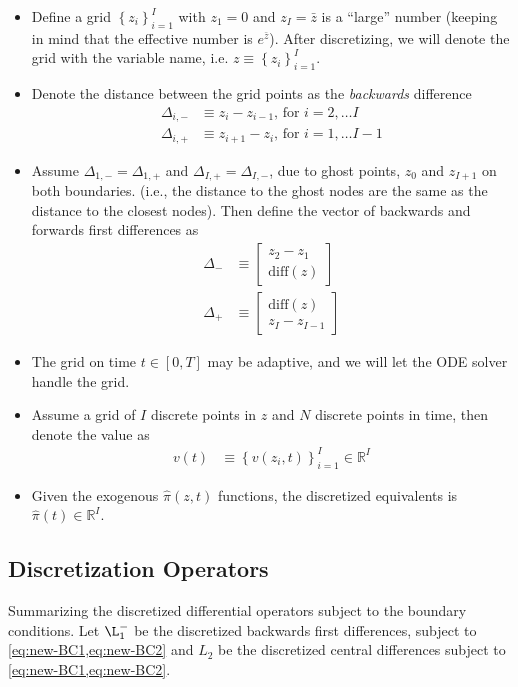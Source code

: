 \documentclass[11pt]{article}
\newcommand{\R}{\ensuremath{\mathbb{R}}}
\newcommand{\set}[1]{\ensuremath{\left\{{#1}\right\}}}
\begin{document}
\begin{itemize}
	\item Define a  grid $\set{z_i}_{i=1}^I$ with $z_1 = 0$ and $z_I = \bar{z}$ is a ``large'' number (keeping in mind that the effective number is $e^{\bar{z}}$).  After discretizing, we will denote the grid with the variable name, i.e. $z \equiv \set{z_i}_{i=1}^I$.
	\item Denote the distance between the grid points as the \textit{backwards} difference
	\begin{align}
			\Delta_{i,-} &\equiv z_i - z_{i-1},\, \text{for } i = 2,\ldots I\\
			\Delta_{i,+} &\equiv z_{i+1} - z_i,\, \text{for } i = 1,\ldots I-1
	\end{align}
	\item Assume $\Delta_{1, -} = \Delta_{1, +}$ and $\Delta_{I, +} = \Delta_{I, -}$, due to ghost points, $z_0$ and $z_{I+1}$ on both boundaries. (i.e., the distance to the ghost nodes are the same as the distance to the closest nodes).  Then define the vector of backwards and forwards first differences as
	\begin{align}
		\Delta_{-} &\equiv \begin{bmatrix} z_2 - z_1 \\
			\text{diff}(z)
		\end{bmatrix}\\
		\Delta_{+} &\equiv \begin{bmatrix} \text{diff}(z)\\
			z_I - z_{I-1}
		\end{bmatrix}
	\end{align}
	\item The grid on time $t \in [0,T]$ may be adaptive, and we will let the ODE solver handle the grid.	
	\item Assume a grid of $I$ discrete points in $z$ and $N$ discrete points in time, then denote the value as
	\begin{align}
		v(t) &\equiv \set{v(z_i, t)}_{i=1}^I\in\R^I
	\end{align}
\item Given the exogenous $\hat{\pi}(z,t)$ functions, the discretized equivalents is $\hat{\pi}(t) \in \R^I$.
\end{itemize}

\subsection{Discretization Operators}\label{sec:discretization-operators}
Summarizing the discretized differential operators subject to the boundary conditions.  Let $\L_1^{-}$ be the discretized backwards first differences, subject to \cref{eq:new-BC1,eq:new-BC2} and $L_2$ be the discretized central differences subject to \cref{eq:new-BC1,eq:new-BC2}.
\end{document}
